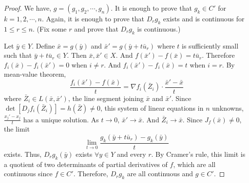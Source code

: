 \begin{proof}
	We have, $g = (g_1, g_2, \cdots,g_n)$.
	It is enough to prove that $g_k \in C'$ for $k=1,2,\cdots,n$.
	Again, it is enough to prove that $D_rg_k$ exists and is continuous for $1 \le r \le n$.
	(Fix some $r$ and prove that $D_rg_k$ is continuous.)

	Let $\bar{y} \in Y$.
	Define $\bar{x} = g(\bar{y})$ and $\bar{x}' = g(\bar{y}+t\bar{u}_r)$ where $t$ is sufficiently small such that $\bar{y}+t\bar{u}_r \in Y$.
	Then $\bar{x},\bar{x}' \in X$.
	And $f(\bar{x}')-f(\bar{x}) = t\bar{u}_r$.
	Therefore $f_i(\bar{x})-f_i(\bar{x}') = 0$ when $i \ne r$.
	And $f_i(\bar{x}')-f_i(\bar{x}) = t$ when $i = r$.
	By mean-value theorem,
	$$\frac{f_i(\bar{x}') - f(\bar{x})}{t} = \nabla f_i(\bar{Z}_i) \cdot \frac{\bar{x}'-\bar{x}}{t}$$
	where $\bar{Z}_i \in L(\bar{x},\bar{x}')$, the line segment joining $\bar{x}$ and $\bar{x}'$.
	Since $\det[D_jf_i(\bar{Z}_i)] = h(\bar{Z}) \ne 0$, this system of linear equations in $n$ unknowns, $\frac{x_j'-x_j}{t}$ has a unique solution.
	As $t \to 0$, $\bar{x}' \to \bar{x}$.
	And $\bar{Z}_i \to \bar{x}$.
	Since $J_f(\bar{x}) \ne 0$, the limit
	$$ \lim_{t \to 0} \frac{g_k(\bar{y}+t\bar{u}_r)-g_k(\bar{y})}{t}$$
	exists.
	Thus, $D_rg_k(\bar{y})$ exists $\forall y \in Y$ and every $r$.	
	By Cramer's rule, this limit is a quotient of two determinants of partial derivatives of $f$, which are all continuous since $f \in C'$.
	Therefore, $D_rg_k$ are all continuous and $g \in C'$.
\end{proof}

